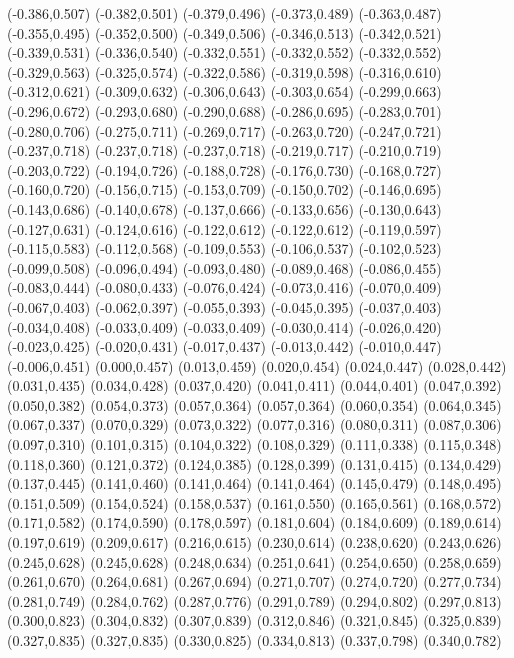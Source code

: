 {{		(-0.386,0.507) (-0.382,0.501) (-0.379,0.496) (-0.373,0.489) (-0.363,0.487) (-0.355,0.495)
		(-0.352,0.500) (-0.349,0.506) (-0.346,0.513) (-0.342,0.521) (-0.339,0.531) (-0.336,0.540)
		(-0.332,0.551) (-0.332,0.552) (-0.332,0.552) (-0.329,0.563) (-0.325,0.574) (-0.322,0.586)
		(-0.319,0.598) (-0.316,0.610) (-0.312,0.621) (-0.309,0.632) (-0.306,0.643) (-0.303,0.654)
		(-0.299,0.663) (-0.296,0.672) (-0.293,0.680) (-0.290,0.688) (-0.286,0.695) (-0.283,0.701)
		(-0.280,0.706) (-0.275,0.711) (-0.269,0.717) (-0.263,0.720) (-0.247,0.721) (-0.237,0.718)
		(-0.237,0.718) (-0.237,0.718) (-0.219,0.717) (-0.210,0.719) (-0.203,0.722) (-0.194,0.726)
		(-0.188,0.728) (-0.176,0.730) (-0.168,0.727) (-0.160,0.720) (-0.156,0.715) (-0.153,0.709)
		(-0.150,0.702) (-0.146,0.695) (-0.143,0.686) (-0.140,0.678) (-0.137,0.666) (-0.133,0.656)
		(-0.130,0.643) (-0.127,0.631) (-0.124,0.616) (-0.122,0.612) (-0.122,0.612) (-0.119,0.597)
		(-0.115,0.583) (-0.112,0.568) (-0.109,0.553) (-0.106,0.537) (-0.102,0.523) (-0.099,0.508)
		(-0.096,0.494) (-0.093,0.480) (-0.089,0.468) (-0.086,0.455) (-0.083,0.444) (-0.080,0.433)
		(-0.076,0.424) (-0.073,0.416) (-0.070,0.409) (-0.067,0.403) (-0.062,0.397) (-0.055,0.393)
		(-0.045,0.395) (-0.037,0.403) (-0.034,0.408) (-0.033,0.409) (-0.033,0.409) (-0.030,0.414)
		(-0.026,0.420) (-0.023,0.425) (-0.020,0.431) (-0.017,0.437) (-0.013,0.442) (-0.010,0.447)
		(-0.006,0.451) (0.000,0.457) (0.013,0.459) (0.020,0.454) (0.024,0.447) (0.028,0.442)
		(0.031,0.435) (0.034,0.428) (0.037,0.420) (0.041,0.411) (0.044,0.401) (0.047,0.392)
		(0.050,0.382) (0.054,0.373) (0.057,0.364) (0.057,0.364) (0.060,0.354) (0.064,0.345)
		(0.067,0.337) (0.070,0.329) (0.073,0.322) (0.077,0.316) (0.080,0.311) (0.087,0.306)
		(0.097,0.310) (0.101,0.315) (0.104,0.322) (0.108,0.329) (0.111,0.338) (0.115,0.348)
		(0.118,0.360) (0.121,0.372) (0.124,0.385) (0.128,0.399) (0.131,0.415) (0.134,0.429)
		(0.137,0.445) (0.141,0.460) (0.141,0.464) (0.141,0.464) (0.145,0.479) (0.148,0.495)
		(0.151,0.509) (0.154,0.524) (0.158,0.537) (0.161,0.550) (0.165,0.561) (0.168,0.572)
		(0.171,0.582) (0.174,0.590) (0.178,0.597) (0.181,0.604) (0.184,0.609) (0.189,0.614)
		(0.197,0.619) (0.209,0.617) (0.216,0.615) (0.230,0.614) (0.238,0.620) (0.243,0.626)
		(0.245,0.628) (0.245,0.628) (0.248,0.634) (0.251,0.641) (0.254,0.650) (0.258,0.659)
		(0.261,0.670) (0.264,0.681) (0.267,0.694) (0.271,0.707) (0.274,0.720) (0.277,0.734)
		(0.281,0.749) (0.284,0.762) (0.287,0.776) (0.291,0.789) (0.294,0.802) (0.297,0.813)
		(0.300,0.823) (0.304,0.832) (0.307,0.839) (0.312,0.846) (0.321,0.845) (0.325,0.839)
		(0.327,0.835) (0.327,0.835) (0.330,0.825) (0.334,0.813) (0.337,0.798) (0.340,0.782)
}}
